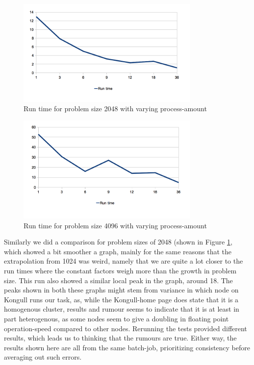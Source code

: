 \begin{figure}[ht]
  \centering
    \includegraphics[width=0.8\textwidth]{RunTimePerProcess2048.png}
    \caption{Run time for problem size 2048 with varying process-amount}
    \label{numprocs2048}
\end{figure}


\begin{figure}[t]
  \centering
    \includegraphics[width=0.8\textwidth]{RunTimePerProcess4096.png}
    \caption{Run time for problem size 4096 with varying process-amount}
    \label{numprocs4096}
\end{figure}

Similarly we did a comparison for problem sizes of 2048 (shown in Figure \ref{numprocs2048}, which showed a bit smoother a graph, mainly for the same reasons that the extrapolation from 1024 was weird, namely that we are quite a lot closer to the run times where the constant factors weigh more than the growth in problem size. This run also showed a similar local peak in the graph, around 18. The peaks shown in both these graphs might stem from variance in which node on Kongull runs our task, as, while
the Kongull-home page does state that it is a homogenous cluster, results and rumour seems to indicate that it is at least in part heterogenous, as some nodes seem to give a doubling in floating point operation-speed compared to other nodes. Rerunning the tests provided different results, which leads us to thinking that the rumours are true. Either way, the results shown here are all from the same batch-job, prioritizing consistency before averaging out such errors.

